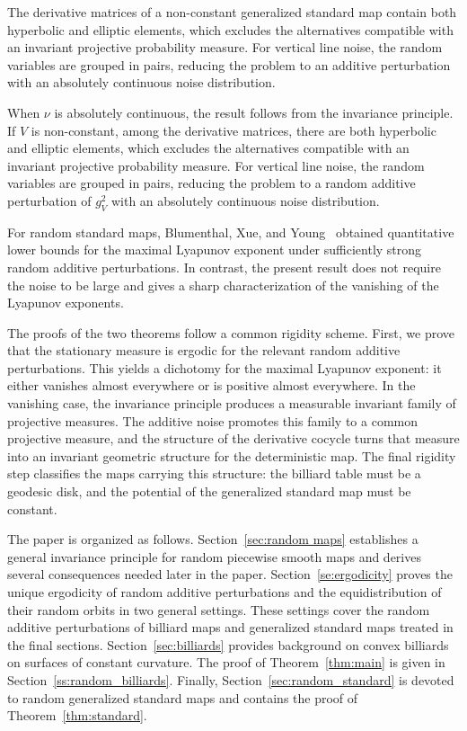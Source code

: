 \documentclass[a4paper,12pt,reqno]{amsart}
\numberwithin{equation}{section}
\begin{document}
The derivative matrices of a non-constant generalized standard map contain both hyperbolic and elliptic elements, which excludes the alternatives compatible with an invariant projective probability measure. For vertical line noise, the random variables are grouped in pairs, reducing the problem to an additive perturbation with an absolutely continuous noise distribution.

When $\nu$ is absolutely continuous, the result follows %
from the invariance principle. If $V$ is non-constant, among the derivative matrices, there are both hyperbolic and elliptic elements, which excludes the alternatives compatible with an invariant projective probability measure. For vertical line noise, the random variables are grouped in pairs, reducing the problem to a random additive perturbation of $g_V^2$ with an absolutely continuous noise distribution.

For random standard maps, Blumenthal, Xue, and Young~\cite{BlumenthalXueYoung} obtained quantitative lower bounds for the maximal Lyapunov exponent under sufficiently strong random additive perturbations. In contrast, the present result does not require the noise to be large and gives a sharp characterization of the vanishing of the Lyapunov exponents.

The proofs of the two theorems follow a common rigidity scheme. First, we prove that the stationary measure is ergodic for the relevant random additive perturbations. This yields a dichotomy for the maximal Lyapunov exponent: it either vanishes almost everywhere or is positive almost everywhere. In the vanishing case, the invariance principle produces a measurable invariant family of projective measures. The additive noise promotes this family to a common projective measure, and the structure of the derivative cocycle turns that measure into an invariant geometric structure for the deterministic map. The final rigidity step classifies the maps carrying this structure: the billiard table must be a geodesic disk, and the potential of the generalized standard map must be constant.

The paper is organized as follows. Section~\ref{sec:random maps} establishes a general invariance principle for random piecewise smooth maps and derives several consequences needed later in the paper. Section~\ref{se:ergodicity} proves the unique ergodicity of random additive perturbations and the equidistribution of their random orbits in two general settings. These settings cover the random additive perturbations of billiard maps and generalized standard maps treated in the final sections. Section~\ref{sec:billiards} provides background on convex billiards on surfaces of constant curvature. The proof of Theorem~\ref{thm:main} is given in Section~\ref{ss:random_billiards}. Finally, Section~\ref{sec:random_standard} is devoted to random generalized standard maps and contains the proof of
Theorem~\ref{thm:standard}.
\end{document}
